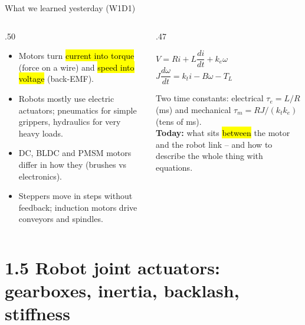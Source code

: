 \documentclass[aspectratio=169,10pt]{beamer}
\begin{document}
\begin{frame}{What we learned yesterday (W1D1)}
\begin{columns}[T]
\begin{column}{.50\textwidth}
\small
\begin{itemize}\setlength\itemsep{3pt}
\item Motors turn \hl{current into torque} (force on a wire) and \hl{speed into voltage} (back-EMF).
\item Robots mostly use electric actuators; pneumatics for simple grippers, hydraulics for very heavy loads.
\item DC, BLDC and PMSM motors differ in how they  (brushes vs electronics).
\item Steppers move in steps without feedback; induction motors drive conveyors and spindles.
\end{itemize}
\end{column}
\begin{column}{.47\textwidth}
\centering
{}
\begin{eqbox}
\small
$V=Ri+L\dfrac{di}{dt}+k_e\omega$\\[1mm]
$J\dfrac{d\omega}{dt}=k_t i-B\omega-T_L$
\end{eqbox}
\small
Two time constants: electrical $\tau_e=L/R$ (ms) and mechanical $\tau_m=RJ/(k_tk_e)$ (tens of ms).\\[1mm]
\textbf{Today:} what sits \hl{between} the motor and the robot link -- and how to describe the whole thing with equations.
\end{column}
\end{columns}
\end{frame}

\section{1.5 Robot joint actuators: gearboxes, inertia, backlash, stiffness}
\end{document}
